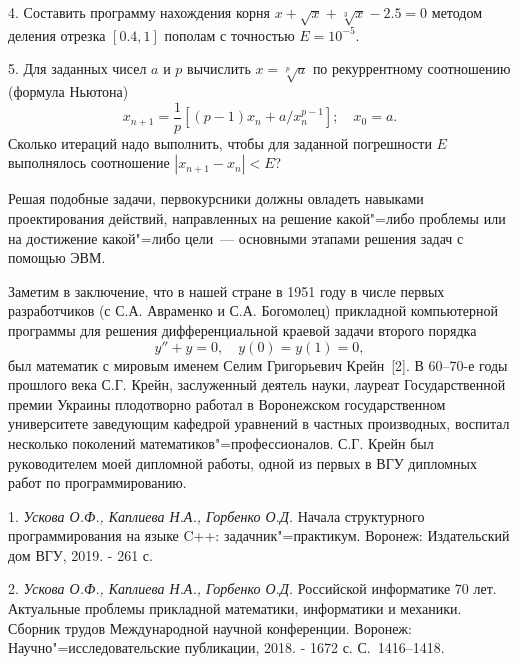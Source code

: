 4. Составить программу нахождения корня $x+\sqrt{x}+\sqrt[3]{x}-2.5=0$ методом деления отрезка $[0.4, 1]$ пополам с точностью
$E=10^{-5}$.

5. Для заданных чисел $a$ и $p$ вычислить $x=\sqrt[p]{a}$ по рекуррентному соотношению (формула Ньютона)
$$
x_{n+1}=\frac{1}{p}[(p-1)x_n+a/x_n^{p-1}]; \quad x_0=a.
$$
Сколько итераций надо выполнить, чтобы для заданной погрешности $E$ выполнялось соотношение $|x_{n+1}-x_n|<E$?

Решая подобные задачи, первокурсники должны овладеть навыками проектирования действий, направленных на решение какой"=либо
проблемы или на достижение какой"=либо цели~--- основными этапами решения задач с помощью ЭВМ.

Заметим в заключение, что в нашей стране в 1951 году в числе первых разработчиков (с С.А. Авраменко и С.А. Богомолец)
прикладной компьютерной программы для решения дифференциальной краевой задачи второго порядка
$$
y''+y=0, \quad y(0)=y(1)=0,
$$
был математик с мировым именем Селим Григорьевич \linebreak Крейн~[2].
В 60--70-е годы прошлого века С.Г. Крейн, заслуженный деятель
науки, лауреат Государственной премии Украины плодотворно работал в Воронежском государственном университете заведующим кафедрой
уравнений в частных производных, воспитал несколько поколений математиков"=профессионалов. С.Г. Крейн был руководителем
моей дипломной работы, одной из первых в ВГУ дипломных работ по программированию.

\litlist

1. {\it Ускова О.Ф., Каплиева Н.А., Горбенко О.Д.} Начала структурного программирования на языке C++: задачник"=практикум.
Воронеж: Издательский дом ВГУ, 2019. - 261 с.

2. {\it Ускова О.Ф., Каплиева Н.А., Горбенко О.Д.} Российской информатике 70 лет. Актуальные проблемы прикладной математики,
информатики и механики. Сборник трудов Международной научной конференции.
Воронеж: Научно"=исследовательские публикации, 2018. - 1672 с. С.~1416--1418.
